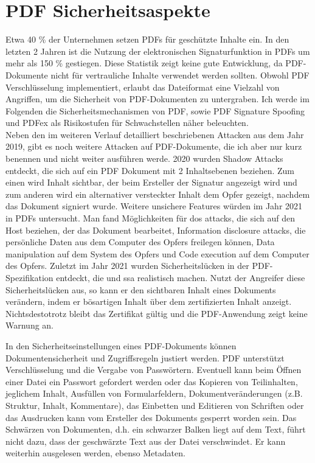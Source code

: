 \section{PDF Sicherheitsaspekte}
Etwa 40 \% der Unternehmen setzen PDFs für geschützte Inhalte ein. In den letzten 2 Jahren ist die Nutzung der elektronischen Signaturfunktion in PDFs um mehr als 150 \% gestiegen. \cite{formilo} Diese Statistik zeigt keine gute Entwicklung, da PDF-Dokumente nicht für vertrauliche Inhalte verwendet werden sollten. Obwohl PDF Verschlüsselung implementiert, erlaubt das Dateiformat eine Vielzahl von Angriffen, um die Sicherheit von PDF-Dokumenten zu untergraben. Ich werde im Folgenden die Sicherheitsmechanismen von PDF, sowie PDF Signature Spoofing und PDFex als Risikostufen für Schwachstellen näher beleuchten. \\ Neben den im weiteren Verlauf detailliert beschriebenen Attacken aus dem Jahr 2019, gibt es noch weitere Attacken auf PDF-Dokumente, die ich aber nur kurz benennen und nicht weiter ausführen werde. 2020 wurden Shadow Attacks entdeckt, die sich auf ein PDF Dokument mit 2 Inhaltsebenen beziehen. Zum einen wird Inhalt sichtbar, der beim Ersteller der Signatur angezeigt wird und zum anderen wird ein alternativer versteckter Inhalt dem Opfer gezeigt, nachdem das Dokument signiert wurde. Weitere unsichere Features würden im Jahr 2021 in PDFs untersucht. Man fand Möglichkeiten für \gls{dos} attacks, die sich auf den Host beziehen, der das Dokument bearbeitet, Information disclosure attacks, die persönliche Daten aus dem Computer des Opfers freilegen können, Data manipulation auf dem System des Opfers und Code execution auf dem Computer des Opfers. Zuletzt im Jahr 2021 wurden Sicherheitslücken in der PDF-Spezifikation entdeckt, die  und \gls{ssa} realistisch machen. Nutzt der Angreifer diese Sicherheitslücken aus, so kann er den sichtbaren Inhalt eines Dokuments verändern, indem er bösartigen Inhalt über dem zertifizierten Inhalt anzeigt. Nichtsdestotrotz bleibt das Zertifikat gültig und die PDF-Anwendung zeigt keine Warnung an. \cite{pdf-insec}
\par
In den Sicherheitseinstellungen eines PDF-Dokuments können Dokumentensicherheit und Zugriffsregeln justiert werden. PDF unterstützt Verschlüsselung und die Vergabe von Passwörtern. Eventuell kann beim Öffnen einer Datei ein Passwort gefordert werden oder das Kopieren von Teilinhalten, jeglichem Inhalt, Ausfüllen von Formularfeldern, Dokumentveränderungen (z.B. Struktur, Inhalt, Kommentare), das Einbetten und Editieren von Schriften oder das Ausdrucken kann vom Ersteller des Dokuments gesperrt worden sein. Das Schwärzen von Dokumenten, d.h. ein schwarzer Balken liegt auf dem Text, führt nicht dazu, dass der geschwärzte Text aus der Datei verschwindet. Er kann weiterhin ausgelesen werden, ebenso Metadaten. 
\cite{adobe-pdf-pades}

